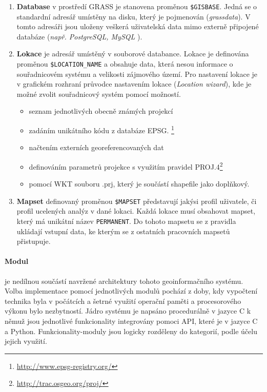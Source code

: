 \documentclass[a4paper,12pt]{report}
\begin{document}
\begin{enumerate}
\item \textbf{Database} v prostředí GRASS je stanovena proměnou \texttt{\$GISBASE}. Jedná se o standardní adresář umístěny na disku, který je pojmenován (\textit{grassdata}). V tomto adresáři jsou uloženy veškerá uživatelská data mimo externě připojené databáze (\textit{např. PostgreSQL, MySQL }).

\item \textbf{Lokace} je adresář umístěný v souborové databance. Lokace je definována proměnou   \texttt{\$LOCATION\_NAME}
a obsahuje data, která nesou informace o souřadnicovém systému a velikosti zájmového území. Pro nastavení lokace je v grafickém rozhraní průvodce nastavením lokace (\textit{Location wizard}), kde je možné zvolit souřadnicový systém pomocí možností.
\begin{itemize}
\item seznam jednotlivých obecně známých projekcí 
\item zadáním unikátního kódu z databáze \acs{EPSG}. \footnote{\url{http://www.epsg-registry.org/}}
\item načtením externích georeferencovaných dat
\item definováním parametrů projekce s využitím pravidel PROJ.4\footnote{\url{http://trac.osgeo.org/proj/}}
\item pomocí \ac{WKT} souboru .prj, který je součástí shapefile jako doplňkový.
\end{itemize}

\item \textbf{Mapset} definovaný proměnou \texttt{\$MAPSET} představují jakýsi profil uživatele, či profil ucelených analýz  v dané lokaci. Každá lokace musí obsahovat mapset, který má unikátní název \texttt{PERMANENT}. Do tohoto mapsetu se z pravidla ukládají vstupní data, ke kterým se z ostatních pracovních mapsetů přistupuje.
\end{enumerate}



\paragraph*{Modul} je nedílnou součástí navržené architektury tohoto geoinformačního systému. Volba implementace pomocí jednotlivých modulů pochází z doby, kdy vypočtení technika byla v počátcích a šetrné využití operační paměti a procesorového výkonu bylo nezbytností. Jádro systému je napsáno procedurálně v jazyce C k němuž jsou  jednotlivé funkcionality integrovány pomoci \acs{API}, které je v jazyce C a Python. Funkcionality-moduly jsou logicky rozděleny do kategorií, podle účelu jejich využití.
\end{document}
